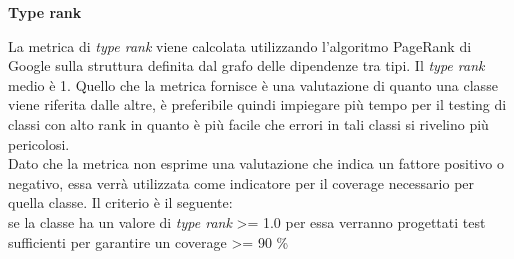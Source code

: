 {\large \textbf{Type rank}\par}
La metrica di \textit{type rank} viene calcolata utilizzando l'algoritmo PageRank di Google sulla struttura definita dal grafo delle dipendenze tra tipi. Il \textit{type rank} medio è 1. Quello che la metrica fornisce è una valutazione di quanto una classe viene riferita dalle altre, è preferibile quindi impiegare più tempo per il testing di classi con alto rank in quanto è più facile che errori in tali classi si rivelino più pericolosi. \\
Dato che la metrica non esprime una valutazione che indica un fattore positivo o negativo, essa verrà utilizzata come indicatore per il coverage necessario per quella classe. Il criterio è il seguente: \\ se la classe ha un valore di \textit{type rank} \textgreater = 1.0 per essa verranno progettati test sufficienti per garantire un coverage \textgreater = 90 \%



